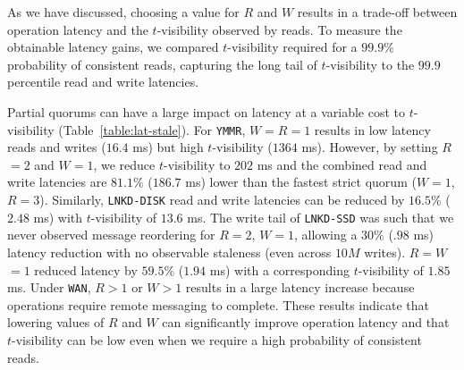\documentclass{vldb}
\begin{document}
As we have discussed, choosing a value for $R$ and $W$ results in a
trade-off between operation latency and the $t$-visibility observed by
reads. To measure the obtainable latency gains, we compared
$t$-visibility required for a $99.9\%$ probability of consistent
reads, capturing the long tail of $t$-visibility to the $99.9$
percentile read and write latencies.

Partial quorums can have a large impact on latency at a variable cost
to $t$-visibility (Table~\ref{table:lat-stale}).  For \texttt{YMMR},
$W$$=$$R$$=$$1$ results in low latency reads and writes ($16.4$ ms)
but high $t$-visibility ($1364$ ms). However, by setting $R$$=$$2$ and
$W$$=$$1$, we reduce $t$-visibility to $202$ ms and the combined read
and write latencies are $81.1\%$ ($186.7$ ms) lower than the fastest
strict quorum ($W$$=$$1$, $R$$=$$3$).  Similarly, \texttt{LNKD-DISK}
read and write latencies can be reduced by $16.5\%$ ($2.48$ ms) with
$t$-visibility of $13.6$ ms.  The write tail of \texttt{LNKD-SSD} was
such that we never observed message reordering for $R$$=$$2$,
$W$$=$$1$, allowing a $30\%$ ($.98$ ms) latency reduction with no
observable staleness (even across $10M$ writes).  $R$$=$$W$$=$$1$
reduced latency by $59.5\%$ ($1.94$ ms) with a corresponding
$t$-visibility of $1.85$ ms.  Under \texttt{WAN}, $R > 1$ or $W > 1$
results in a large latency increase because operations require
remote messaging to complete. These results indicate that lowering
values of $R$ and $W$ can significantly improve operation latency and
that $t$-visibility can be low even when we require a high probability
of consistent reads.
\end{document}
